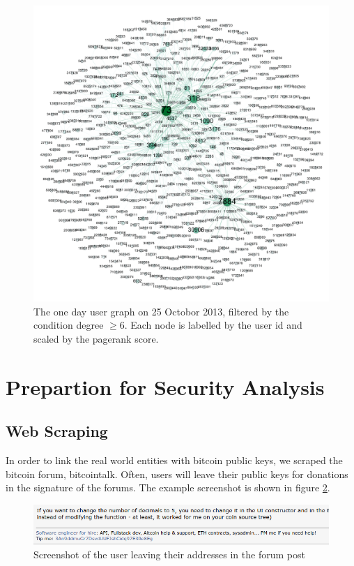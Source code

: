 \documentclass[runningheads,a4paper]{llncs}[2017/09/04]
\begin{document}
\begin{figure}[h]
	\centering 
	\includegraphics[width=\columnwidth]{viz} 
	\caption{The one day user graph on 25 Octobor 2013, filtered by the condition degree $\geq 6$. Each node is labelled by the user id and scaled by the pagerank score.} %
	\label{viz}
\end{figure}


\section{Prepartion for Security Analysis}

\subsection{Web Scraping}

In order to link the real world entities with bitcoin public keys, we scraped the bitcoin forum, bitcointalk.
Often, users will leave their public keys for donations in the signature of the forums. The example screenshot is shown in figure \ref{shot}.

\begin{figure}[h]
	\centering 
	\includegraphics[width=\columnwidth]{address} 
	\caption{Screenshot of the user leaving their addresses in the forum post} %
	\label{shot}
\end{figure}
\end{document}
